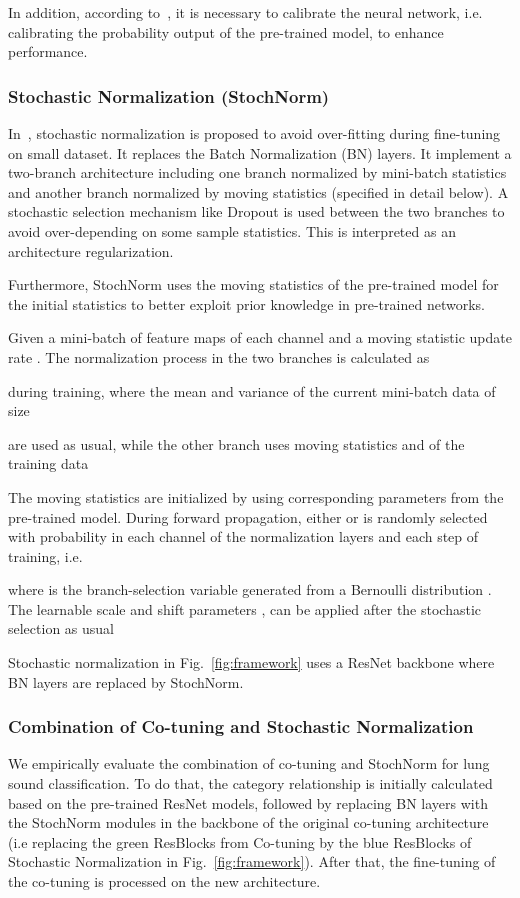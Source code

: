 \documentclass[journal]{IEEEtran}
\begin{document}
In addition, according to~\cite{you2020co}, it is necessary to calibrate the neural network, i.e. calibrating the probability output of the pre-trained model, to enhance performance.


\subsubsection{Stochastic Normalization (StochNorm)}
In~\cite{kou2020stochastic}, stochastic normalization is proposed to avoid over-fitting during fine-tuning on small dataset. It replaces the Batch Normalization (BN) layers. It implement a two-branch architecture including one branch normalized by mini-batch statistics and another branch normalized by moving statistics (specified in detail below). 
A stochastic selection mechanism like Dropout is used between the two branches to avoid over-depending on some sample statistics. This is interpreted as an architecture regularization. 

Furthermore, StochNorm uses the moving statistics of the pre-trained model for the initial statistics to better exploit prior knowledge in pre-trained networks.

Given a mini-batch of feature maps of each channel  and a moving statistic update rate . The normalization process in the two branches is calculated as 

during training, where the mean  and variance  of the current mini-batch data of size  

are used as usual, while the other branch uses moving statistics  and  of the training data 

The moving statistics are initialized by using corresponding parameters from the pre-trained model. During forward propagation, either  or  is randomly selected with probability  in each channel of the normalization layers and each step of training, i.e. 

where  is the branch-selection variable generated from a Bernoulli distribution . The learnable scale and shift parameters ,  can be applied after the stochastic selection as usual

Stochastic normalization in Fig.~\ref{fig:framework} uses a ResNet backbone where BN layers are replaced by StochNorm.

\subsubsection{Combination of Co-tuning and Stochastic Normalization}
 We empirically evaluate the combination of co-tuning and StochNorm for lung sound classification. To do that, the category relationship is initially calculated based on the pre-trained ResNet models, followed by replacing BN layers with the StochNorm modules in the backbone of the original co-tuning architecture (i.e replacing the green ResBlocks from Co-tuning by the blue ResBlocks of Stochastic Normalization in Fig.~\ref{fig:framework}). After that, the fine-tuning of the co-tuning is processed on the new architecture.
\end{document}

